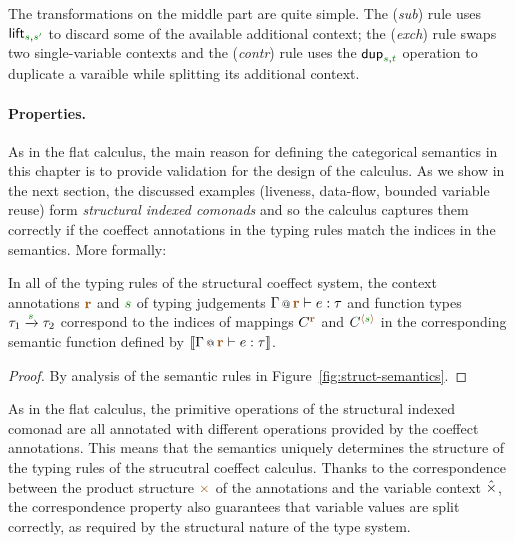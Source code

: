 The transformations on the middle part are quite simple. The (\emph{sub}) rule 
uses $\ident{lift}_{\cclrd{s}, \cclrd{s'}}$ to discard some of the available additional context;
the (\emph{exch}) rule swaps two single-variable contexts and the (\emph{contr}) rule
uses the $\ident{dup}_{\cclrd{s}, \cclrd{t}}$ operation to duplicate a varaible while 
splitting its additional context.

\paragraph{Properties.}

As in the flat calculus, the main reason for defining the categorical semantics in this chapter
is to provide validation for the design of the calculus. As we show in the next section, the 
discussed examples (liveness, data-flow, bounded variable reuse) form \emph{structural indexed
comonads} and so the calculus captures them correctly if the coeffect annotations in the typing
rules match the indices in the semantics. More formally:

\begin{remark}[Correspondence]
In all of the typing rules of the structural coeffect system, the context annotations $\aclrd{\textbf{r}}$ 
and $\cclrd{s}$ of typing judgements $\coctx{\Gamma}{\aclrd{\textbf{r}}} \vdash e : \tau$ and function types 
$\tau_1 \xrightarrow{\cclrd{s}} \tau_2$  correspond to the indices of mappings $\ctyp{\aclrd{\textbf{r}}}{}$ 
and $\ctyp{\alift{\cclrd{s}}}{}$ in the corresponding semantic function defined 
by $\sem{\coctx{\Gamma}{\aclrd{\textbf{r}}} \vdash e : \tau}$.
\end{remark}
\begin{proof}
By analysis of the semantic rules in Figure~\ref{fig:struct-semantics}.
\end{proof}

\noindent
As in the flat calculus, the primitive operations of the structural indexed comonad are all 
annotated with different operations provided by the coeffect annotations. This means that the
semantics uniquely determines the structure of the typing rules of the strucutral coeffect
calculus. Thanks to the correspondence between the product structure $\atimes$ of the annotations
and the variable context $\hat{\times}$, the correspondence property also guarantees that variable
values are split correctly, as required by the structural nature of the type system.


